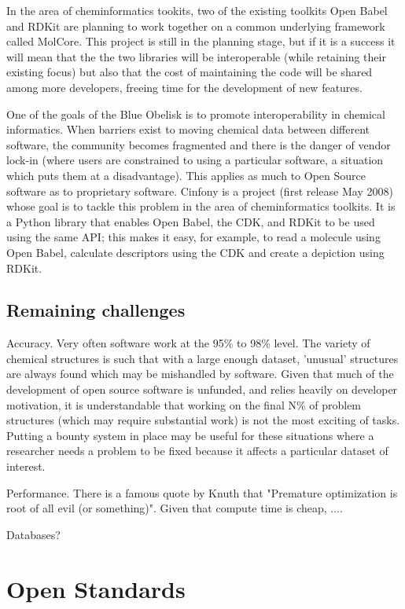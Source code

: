 \documentclass[10pt]{bmc_article}
\newenvironment{bmcformat}{\begin{raggedright}\baselineskip20pt\sloppy\setboolean{publ}{false}}{\end{raggedright}\baselineskip20pt\sloppy}
\begin{document}
\begin{bmcformat}
In the area of cheminformatics tookits, two of the existing toolkits Open Babel and RDKit are planning to work together on a common underlying framework called MolCore. This project is still in the planning stage, but if it is a success it will mean that the the two libraries will be interoperable (while retaining their existing focus) but also that the cost of maintaining the code will be shared among more developers, freeing time for the development of new features.

One of the goals of the Blue Obelisk is to promote interoperability in chemical
informatics. When barriers exist to moving chemical data between
different software, the community becomes fragmented and there is
the danger of vendor lock-in (where users are constrained to using
a particular software, a situation which puts them at a
disadvantage). This applies as much to Open Source software as to
proprietary software. Cinfony is a project (first release May 2008)
whose goal is to tackle this problem in the area of cheminformatics toolkits.
It is a Python library that enables Open Babel, the CDK, and RDKit to
be used using the same API; this makes it easy, for example, to read a
molecule using Open Babel, calculate descriptors using the CDK and
create a depiction using RDKit.

  \subsection*{Remaining challenges}

Accuracy. Very often software work at the 95\% to 98\% level. The variety of chemical structures is such that with a large enough dataset, 'unusual' structures are always found which may be mishandled by software. Given that much of the development of open source software is unfunded, and relies heavily on developer motivation, it is understandable that working on the final N\% of problem structures (which may require substantial work) is not the most exciting of tasks. Putting a bounty system in place may be useful for these situations where a researcher needs a problem to be fixed because it affects a particular dataset of interest.

Performance. There is a famous quote by Knuth that "Premature optimization is root of all evil (or something)". Given that compute time is cheap, ....

Databases?

\section*{Open Standards}

\end{bmcformat}
\end{document}
